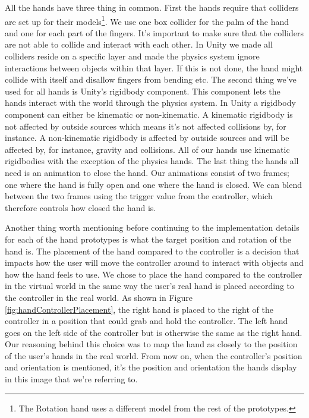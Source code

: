All the hands have three thing in common. First the hands require that colliders are set up for their models\footnote{The Rotation hand uses a different model from the rest of the prototypes.}. We use one box collider for the palm of the hand and one for each part of the fingers. It's important to make sure that the colliders are not able to collide and interact with each other. In Unity we made all colliders reside on a specific layer and made the physics system ignore interactions between objects within that layer. If this is not done, the hand might collide with itself and disallow fingers from bending etc. The second thing we've used for all hands is Unity's rigidbody component. This component lets the hands interact with the world through the physics system. In Unity a rigidbody component can either be kinematic or non-kinematic. A kinematic rigidbody is not affected by outside sources which means it's not affected collisions by, for instance. A non-kinematic rigidbody is affected by outside sources and will be affected by, for instance, gravity and collisions. All of our hands use kinematic rigidbodies with the exception of the physics hands. The last thing the hands all need is an animation to close the hand. Our animations consist of two frames; one where the hand is fully open and one where the hand is closed. We can blend between the two frames using the trigger value from the controller, which therefore controls how closed the hand is.

Another thing worth mentioning before continuing to the implementation details for each of the hand prototypes is what the target position and rotation of the hand is. The placement of the hand compared to the controller is a decision that impacts how the user will move the controller around to interact with objects and how the hand feels to use. We chose to place the hand compared to the controller in the virtual world in the same way the user's real hand is placed according to the controller in the real world. As shown in Figure \ref{fig:handControllerPlacement}, the right hand is placed to the right of the controller in a position that could grab and hold the controller. The left hand goes on the left side of the controller but is otherwise the same as the right hand. Our reasoning behind this choice was to map the hand as closely to the position of the user's hands in the real world. From now on, when the controller's position and orientation is mentioned, it's the position and orientation the hands display in this image that we're referring to.

